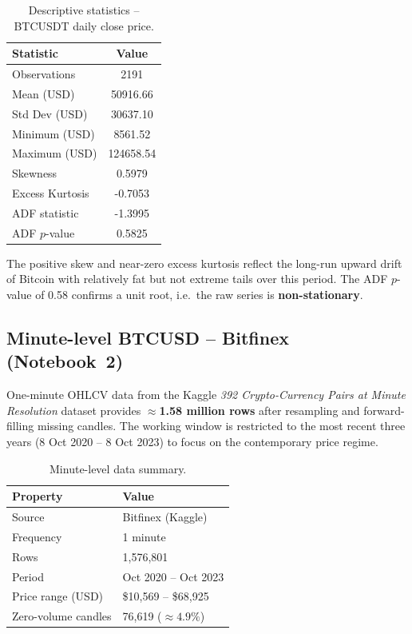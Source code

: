 \documentclass[12pt,a4paper]{article}
\begin{document}
\begin{table}[H]
  \centering
  \caption{Descriptive statistics -- BTCUSDT daily close price.}
  \label{tab:stats_daily}
  \begin{tabular}{lS[table-format=6.4]}
    \toprule
    Statistic & {Value} \\
    \midrule
    Observations      & 2191 \\
    Mean (USD)        & 50916.66 \\
    Std Dev (USD)     & 30637.10 \\
    Minimum (USD)     & 8561.52 \\
    Maximum (USD)     & 124658.54 \\
    Skewness          & 0.5979 \\
    Excess Kurtosis   & -0.7053 \\
    ADF statistic     & -1.3995 \\
    ADF $p$-value     & 0.5825 \\
    \bottomrule
  \end{tabular}
\end{table}

The positive skew and near-zero excess kurtosis reflect the long-run upward
drift of Bitcoin with relatively fat but not extreme tails over this period.
The ADF $p$-value of 0.58 confirms a unit root, i.e.\ the raw series is
\textbf{non-stationary}.

\subsection{Minute-level BTCUSD -- Bitfinex (Notebook~2)}

One-minute OHLCV data from the Kaggle
\textit{392 Crypto-Currency Pairs at Minute Resolution} dataset provides
\textbf{$\approx$1.58 million rows} after resampling and forward-filling
missing candles.  The working window is restricted to the most recent three
years (8 Oct 2020 -- 8 Oct 2023) to focus on the contemporary price regime.

\begin{table}[H]
  \centering
  \caption{Minute-level data summary.}
  \label{tab:stats_minute}
  \begin{tabular}{ll}
    \toprule
    Property & Value \\
    \midrule
    Source              & Bitfinex (Kaggle) \\
    Frequency           & 1 minute \\
    Rows                & 1,576,801 \\
    Period              & Oct 2020 -- Oct 2023 \\
    Price range (USD)   & \$10,569 -- \$68,925 \\
    Zero-volume candles & 76,619 ($\approx4.9\%$) \\
    \bottomrule
  \end{tabular}
\end{table}
\end{document}
